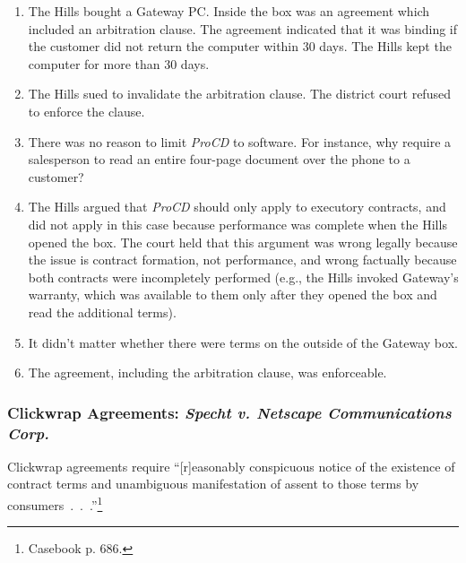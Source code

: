 \begin{enumerate}
    \item The Hills bought a Gateway PC. Inside the box was an agreement which 
    included an arbitration clause. The agreement indicated that it was 
    binding if the customer did not return the computer within 30 days. The 
    Hills kept the computer for more than 30 days.
    \item The Hills sued to invalidate the arbitration clause. The district 
    court refused to enforce the clause.
    \item There was no reason to limit \emph{ProCD} to software. For instance, 
    why require a salesperson to read an entire four-page document over the 
    phone to a customer?
    \item The Hills argued that \emph{ProCD} should only apply to executory 
    contracts, and did not apply in this case because performance was complete 
    when the Hills opened the box. The court held that this argument was wrong 
    legally because the issue is contract formation, not performance, and 
    wrong factually because both contracts were incompletely performed (e.g., 
    the Hills invoked Gateway's warranty, which was available to them only 
    after they opened the box and read the additional terms).
    \item It didn't matter whether there were terms on the outside of the 
    Gateway box.
    \item The agreement, including the arbitration clause, was enforceable.
\end{enumerate}

\subsubsection{Clickwrap Agreements: \emph{Specht v. Netscape Communications 
Corp.}}

Clickwrap agreements require ``[r]easonably conspicuous notice of the 
existence of contract terms and unambiguous manifestation of assent to those 
terms by consumers~.~.~.''\footnote{Casebook p. 686.}

